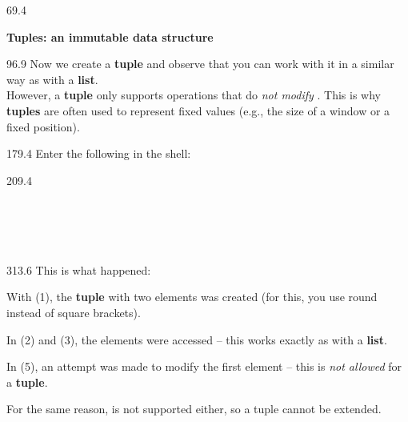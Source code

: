 \documentclass{aslab}
\newcommand*\inp[1]{\makebox[26.4bp][l]{\ttfamily(#1)}}
\begin{document}
\nextpage
\begin{region}{69.4}
\begin{tasks}[start=3]
\item \textbf{Tuples: an immutable data structure}
\end{tasks}
\end{region}

\begin{region}[x=74.7,right=0,pitch=14.05]{96.9}
Now we create a \textbf{tuple}  and observe that you can work with
it in a similar way as with a \textbf{list}.\\
However, a \textbf{tuple} only supports operations that do \emph{not modify}
. This is why \textbf{tuples} are often used to represent fixed
values (e.g., the size of a window or a fixed position).
\end{region}

\begin{region}[x=74.7,right=0]{179.4}
Enter the following in the shell:
\end{region}

\begin{region}[x=74.7,right=0,pitch=15.4]{209.4}
\inp{1}\\
\inp{2}\\
\inp{3}\\
\inp{4}\\
\inp{5}\\
\inp{6}
\end{region}

\begin{region}[x=74.7,right=0,pitch=14.0]{313.6}
This is what happened:
\begin{dotlist}
\item With (1), the \textbf{tuple}  with two elements was created
  (for this, you use round instead of square brackets).
\item In (2) and (3), the elements were accessed -- this works exactly as
  with a \textbf{list}.
\item In (5), an attempt was made to modify the first element -- this is
  \emph{not allowed} for a \textbf{tuple}.
\item For the same reason,  is not supported either, so a
  tuple cannot be extended.
\end{dotlist}
\end{region}
\end{document}
